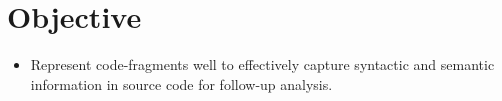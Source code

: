 \section{Objective}\label{sec:obj}
\begin{frame}{}
\begin{itemize}
    \item Represent code-fragments well to effectively capture syntactic and semantic information in source code for follow-up analysis.
\end{itemize}
\end{frame}